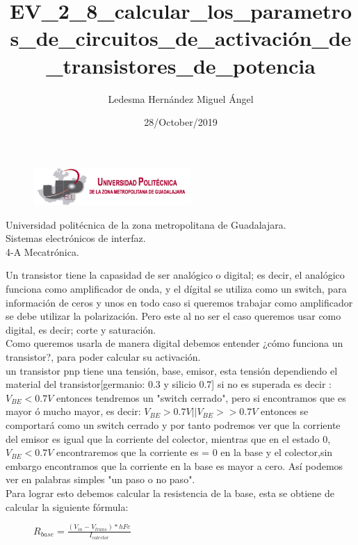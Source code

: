 \documentclass[letterpaper]{article}
\title{EV\_2\_8\_calcular\_los\_parametros\_de\_circuitos\_de\_activación\_de\_transistores\_de\_potencia}
\author{Ledesma Hernández Miguel Ángel}
\date{28/October/2019}
\begin{document}
\begin{figure}[t]
    \includegraphics[width=6cm]{img/logo.png}
\end{figure}
\vspace{2cm}
\maketitle
\vspace{12cm}
\begin{center}
   Universidad politécnica de la zona metropolitana de Guadalajara.\\
Sistemas electrónicos de interfaz.\\
4-A Mecatrónica.\\ 
\end{center}
\newpage
Un transistor tiene la capasidad de ser analógico o digital; es decir, el analógico funciona como amplificador de onda, y el dígital se utiliza como un switch, para información de ceros y unos en todo caso si queremos trabajar como amplificador se debe utilizar la polarización. Pero este al no ser el caso queremos usar como digital, es decir; corte y saturación.\\
Como queremos usarla de manera digital debemos entender ¿cómo funciona un transistor?, para poder calcular su activación.\\
un transistor pnp tiene una tensión, base, emisor, esta tensión dependiendo el material del transistor[germanio: 0.3 y silicio 0.7] si no es superada es decir : $V_{BE} < 0.7V$ entonces tendremos un "switch cerrado", pero si encontramos que es mayor ó mucho mayor, es decir: $V_{BE}>0.7V  ||  V_{BE}>>0.7V$ entonces se comportará como un switch cerrado y por tanto podremos ver que la corriente del emisor es igual que la corriente del colector, mientras que en el estado 0, $V_{BE} < 0.7V $ encontraremos que la corriente es = 0 en la base y el colector,sin embargo encontramos que la corriente en la base es mayor a cero. Así podemos ver en palabras simples "un paso o no paso".\\
Para lograr esto debemos calcular la resistencia de la base, esta se obtiene de calcular la siguiente fórmula:\\

\begin{figure}[htbp]
\centering
\begin{huge}
	$R_{base}=\frac{(V_{in}-V_{trans})*hFe}{I_{colector}}$\\
\end{huge}
\end{figure}
	
\end{document}
